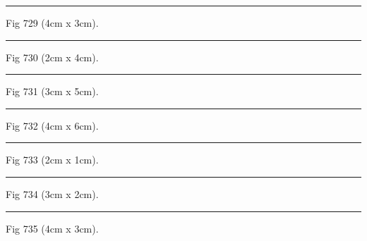 \documentclass[a4paper,11pt]{article}
\begin{document}
\begin{swarmwrap}%
  \begin{minipage}[t]{4cm}
    \centering
    \rule{\linewidth}{3cm}
    {\footnotesize Fig 729 (4cm x 3cm).}
  \end{minipage}%
\end{swarmwrap}%
\swarmwrapnext
\lipsum[129]%

\begin{swarmwrap}%
  \begin{minipage}[t]{2cm}
    \centering
    \rule{\linewidth}{4cm}
    {\footnotesize Fig 730 (2cm x 4cm).}
  \end{minipage}%
\end{swarmwrap}%
\swarmwrapnext
\lipsum[130]%

\begin{swarmwrap}%
  \begin{minipage}[t]{3cm}
    \centering
    \rule{\linewidth}{5cm}
    {\footnotesize Fig 731 (3cm x 5cm).}
  \end{minipage}%
\end{swarmwrap}%
\swarmwrapnext
\lipsum[131]%

\begin{swarmwrap}%
  \begin{minipage}[t]{4cm}
    \centering
    \rule{\linewidth}{6cm}
    {\footnotesize Fig 732 (4cm x 6cm).}
  \end{minipage}%
\end{swarmwrap}%
\swarmwrapnext
\lipsum[132]%

\begin{swarmwrap}%
  \begin{minipage}[t]{2cm}
    \centering
    \rule{\linewidth}{1cm}
    {\footnotesize Fig 733 (2cm x 1cm).}
  \end{minipage}%
\end{swarmwrap}%
\swarmwrapnext
\lipsum[133]%

\begin{swarmwrap}%
  \begin{minipage}[t]{3cm}
    \centering
    \rule{\linewidth}{2cm}
    {\footnotesize Fig 734 (3cm x 2cm).}
  \end{minipage}%
\end{swarmwrap}%
\swarmwrapnext
\lipsum[134]%

\begin{swarmwrap}%
  \begin{minipage}[t]{4cm}
    \centering
    \rule{\linewidth}{3cm}
    {\footnotesize Fig 735 (4cm x 3cm).}
  \end{minipage}%
\end{swarmwrap}%
\swarmwrapnext
\lipsum[135]%
\end{document}
